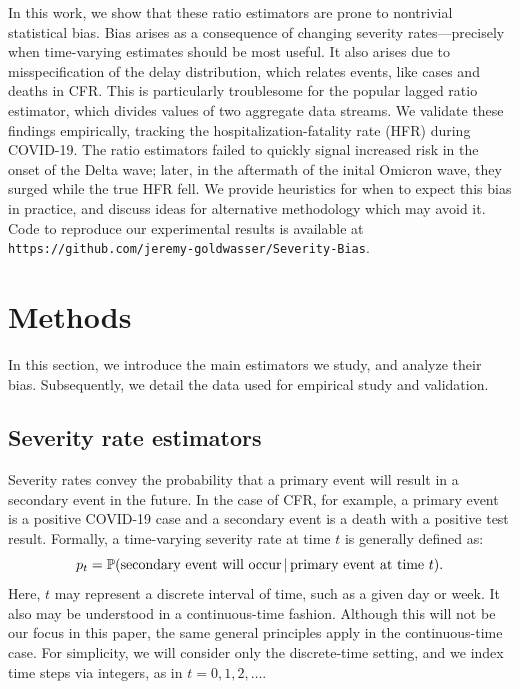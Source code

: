 \documentclass{article}
\newcommand{\given}{\, \vert \,}
\begin{document}
In this work, we show that these ratio estimators are prone to nontrivial
statistical bias. Bias arises as a consequence of changing severity
rates---precisely when time-varying estimates should be most useful. It also 
arises due to misspecification of the delay distribution, which relates events, 
like cases and deaths in CFR. This is particularly troublesome for the popular
lagged ratio estimator, which divides values of two aggregate data streams. We
validate these findings empirically, tracking the hospitalization-fatality rate
(HFR) during COVID-19. The ratio estimators failed to quickly signal increased
risk in the onset of the Delta wave; later, in the aftermath of the inital
Omicron wave, they surged while the true HFR fell. We provide heuristics for
when to expect this bias in practice, and discuss ideas for alternative
methodology which may avoid it. Code to reproduce our experimental results is available at \texttt{https://github.com/jeremy-goldwasser/Severity-Bias}.

\section{Methods}
\label{sec:methods}

In this section, we introduce the main estimators we study, and analyze their 
bias. Subsequently, we detail the data used for empirical study and validation. 

\subsection{Severity rate estimators}
\label{sec:defs}

Severity rates convey the probability that a primary event will result in a
secondary event in the future. In the case of CFR, for example, a primary event
is a positive COVID-19 case and a secondary event is a death with a positive
test result. Formally, a time-varying severity rate at time $t$ is generally
defined as:  
\begin{equation}
\label{eq:severity}
p_t = \P(\text{secondary event will occur} \given \text{primary event at time 
  $t$}).   
\end{equation}
Here, $t$ may represent a discrete interval of time, such as a given day or 
week. It also may be understood in a continuous-time fashion. Although this will    
not be our focus in this paper, the same general principles apply in the
continuous-time case. For simplicity, we will consider only the discrete-time 
setting, and we index time steps via integers, as in $t=0,1,2,\dots$.    
\end{document}
